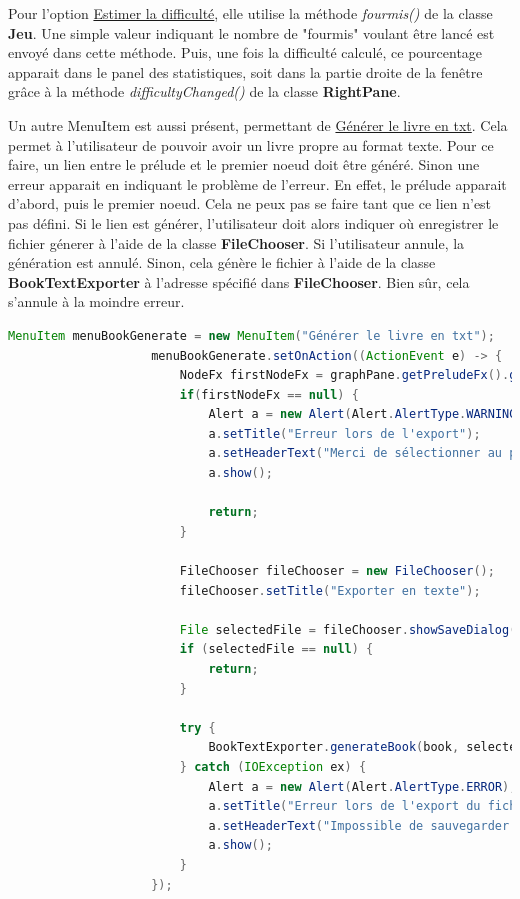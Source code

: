 				Pour l'option \underline{Estimer la difficulté}, elle utilise la méthode \textit{fourmis()} de la classe \textbf{Jeu}. Une simple valeur indiquant le nombre de "fourmis" voulant être lancé est envoyé dans cette méthode. Puis, une fois la difficulté calculé, ce pourcentage apparait dans le panel des statistiques, soit dans la partie droite de la fenêtre grâce à la méthode \textit{difficultyChanged()} de la classe \textbf{RightPane}.

				Un autre MenuItem est aussi présent, permettant de \underline{Générer le livre en txt}. Cela permet à l'utilisateur de pouvoir avoir un livre propre au format texte.
				Pour ce faire, un lien entre le prélude et le premier noeud doit être généré. Sinon une erreur apparait en indiquant le problème de l'erreur. En effet, le prélude apparait d'abord, puis le premier noeud. Cela ne peux pas se faire tant que ce lien n'est pas défini. Si le lien est générer, l'utilisateur doit alors indiquer où enregistrer le fichier génerer à l'aide de la classe \textbf{FileChooser}. Si l'utilisateur annule, la génération est annulé. Sinon, cela génère le fichier à l'aide de la classe \textbf{BookTextExporter} à l'adresse spécifié dans \textbf{FileChooser}. Bien sûr, cela s'annule à la moindre erreur.

				\begin{lstlisting}[gobble=20, language=java, caption=Génération du livre en txt]
					MenuItem menuBookGenerate = new MenuItem("Générer le livre en txt");
					menuBookGenerate.setOnAction((ActionEvent e) -> {
						NodeFx firstNodeFx = graphPane.getPreludeFx().getFirstNode();
						if(firstNodeFx == null) {
							Alert a = new Alert(Alert.AlertType.WARNING);
							a.setTitle("Erreur lors de l'export");
							a.setHeaderText("Merci de sélectionner au préalable le noeud de départ");
							a.show();

							return;
						}

						FileChooser fileChooser = new FileChooser();
						fileChooser.setTitle("Exporter en texte");

						File selectedFile = fileChooser.showSaveDialog(this);
						if (selectedFile == null) {
							return;
						}

						try {
							BookTextExporter.generateBook(book, selectedFile.getAbsolutePath());
						} catch (IOException ex) {
							Alert a = new Alert(Alert.AlertType.ERROR);
							a.setTitle("Erreur lors de l'export du fichier");
							a.setHeaderText("Impossible de sauvegarder le fichier sur le disque");
							a.show();
						}
					});
				\end{lstlisting}

